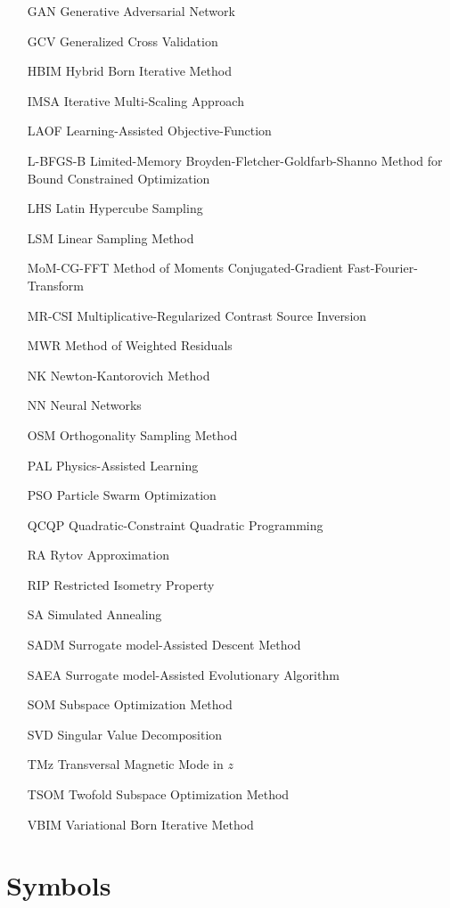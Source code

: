 \begin{itemize}[labelwidth=5em,leftmargin=\dimexpr{}+\relax,align=left]
			\item[GAN] Generative Adversarial Network
			\item[GCV] Generalized Cross Validation
			\item[HBIM] Hybrid Born Iterative Method 
			\item[IMSA] Iterative Multi-Scaling Approach
			\item[LAOF] Learning-Assisted Objective-Function
			\item[L-BFGS-B] Limited-Memory Broyden-Fletcher-Goldfarb-Shanno Method for Bound Constrained Optimization
			\item[LHS] Latin Hypercube Sampling
			\item[LSM] Linear Sampling Method
			\item[MoM-CG-FFT] Method of Moments Conjugated-Gradient Fast-Fourier-Transform
			\item[MR-CSI] Multiplicative-Regularized Contrast Source Inversion
			\item[MWR] Method of Weighted Residuals
			\item[NK] Newton-Kantorovich Method
			\item[NN] Neural Networks
			\item[OSM] Orthogonality Sampling Method
			\item[PAL] Physics-Assisted Learning
			\item[PSO] Particle Swarm Optimization
			\item[QCQP] Quadratic-Constraint Quadratic Programming
			\item[RA] Rytov Approximation
			\item[RIP] Restricted Isometry Property
			\item[SA] Simulated Annealing
			\item[SADM] Surrogate model-Assisted Descent Method
			\item[SAEA] Surrogate model-Assisted Evolutionary Algorithm
			\item[SOM] Subspace Optimization Method
			\item[SVD] Singular Value Decomposition
			\item[TMz] Transversal Magnetic Mode in $z$
			\item[TSOM] Twofold Subspace Optimization Method
			\item[VBIM] Variational Born Iterative Method
		\end{itemize}
	
		\thispagestyle{empty}

	\section*{Symbols}
	

